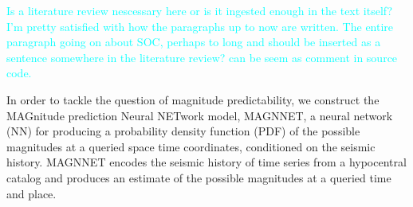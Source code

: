\documentclass[pdflatex]{sn-jnl}
\newcommand{\neri}[1]{{\textcolor{cyan}{#1}}}
\begin{document}
\neri{Is a literature review nescessary here or is it ingested enough in the text itself? I'm pretty satisfied with how the paragraphs up to now are written.}\newline
\neri{The entire paragraph going on about SOC, perhaps to long and should be inserted as a sentence somewhere in the literature review? can be seem as comment in source code.}



In order to tackle the question of magnitude predictability, we construct the MAGnitude prediction Neural NETwork model, MAGNNET, a neural network (NN) for producing a probability density function (PDF) of the possible magnitudes at a queried space time coordinates, conditioned on the seismic history. MAGNNET encodes the seismic history of time series from a hypocentral catalog and produces an estimate of the possible magnitudes at a queried time and place.
\end{document}
